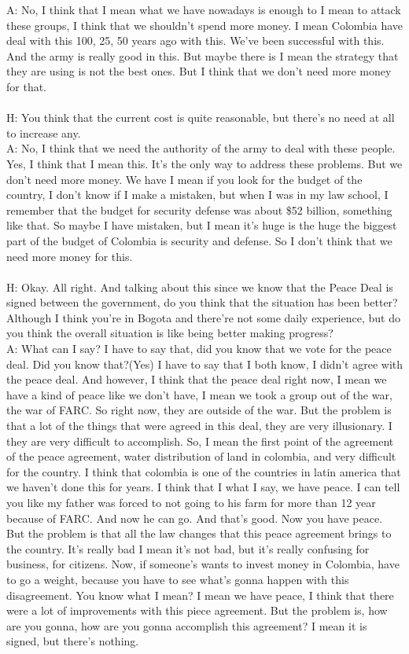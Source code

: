 \documentclass{phyasgn}\usepackage{nag}
\begin{document}
A: No, I think that I mean what we have nowadays is enough to I mean to attack these groups, I think that we shouldn't spend more money. I mean Colombia have deal with this 100, 25, 50 years ago with this. We've been successful with this. And the army is really good in this. But maybe there is I mean the strategy that they are using is not the best ones. But I think that we don't need more money for that.\\
\\
H: You think that the current cost is quite reasonable, but there's no need at all to increase any.\\
A: No, I think that we need the authority of the army to deal with these people. Yes, I think that I mean this. It's the only way to address these problems. But we don't need more money. We have I mean if you look for the budget of the country, I don't know if I make a mistaken, but when I was in my law school, I remember that the budget for security defense was about \$52 billion, something like that. So maybe I have mistaken, but I mean it's huge is the huge the biggest part of the budget of Colombia is security and defense. So I don't think that we need more money for this.\\
\\
H: Okay. All right. And talking about this since we know that the Peace Deal is signed between the government, do you think that the situation has been better? Although I think you're in Bogota and there're not some daily experience, but do you think the overall situation is like being better making progress?\\
A: What can I say? I have to say that, did you know that we vote for the peace deal. Did you know that?(Yes) I have to say that I both know, I didn't agree with the peace deal. And however, I think that the peace deal right now, I mean we have a kind of peace like we don't have, I mean we took a group out of the war, the war of FARC. So right now, they are outside of the war. But the problem is that a lot of the things that were agreed in this deal, they are very illusionary. I they are very difficult to accomplish. So, I mean the first point of the agreement of the peace agreement, water distribution of land in colombia, and very difficult for the country. I think that colombia is one of the countries in latin america that we haven't done this for years. I think that I what I say, we have peace. I can tell you like my father was forced to not going to his farm for more than 12 year because of FARC. And now he can go. And that's good. Now you have peace. But the problem is that all the law changes that this peace agreement brings to the country. It's really bad I mean it's not bad, but it's really confusing for business, for citizens. Now, if someone's wants to invest money in Colombia, have to go a weight, because you have to see what's gonna happen with this disagreement. You know what I mean? I mean we have peace, I think that there were a lot of improvements with this piece agreement. But the problem is, how are you gonna, how are you gonna accomplish this agreement? I mean it is signed, but there's nothing.\\
\end{document}
